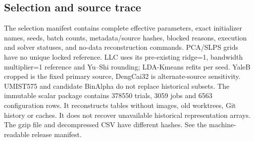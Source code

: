 \subsection{Selection and source trace}
The selection manifest contains complete effective parameters, exact initializer names, seeds, batch counts, metadata/source hashes, blocked reasons, execution and solver statuses, and no-data reconstruction commands. PCA/SLPS grids have no unique locked reference. LLC uses its pre-existing ridge=1, bandwidth multiplier=1 reference and Yu--Shi rounding; LDA-Kmeans refits per seed. YaleB cropped is the fixed primary source, DengCai32 is alternate-source sensitivity. UMIST575 and candidate BinAlpha do not replace historical subsets.
The immutable scalar package contains 378550 trials, 3059 jobs and 6563 configuration rows. It reconstructs tables without images, old worktrees, Git history or caches. It does not recover unavailable historical representation arrays. The gzip file and decompressed CSV have different hashes. See the machine-readable release manifest.
